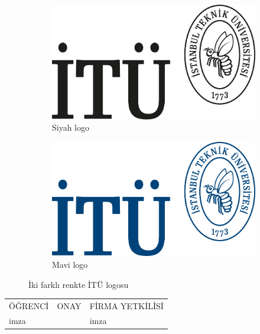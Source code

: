 \documentclass[12pt,a4paper]{report}
\begin{document}
\shorthandoff{=} %
\begin{figure}[h!]
  \centering
  \begin{subfigure}[b]{0.4\linewidth}
    \includegraphics[width=\linewidth]{black}
    \caption{Siyah logo}
  \end{subfigure}
  \begin{subfigure}[b]{0.4\linewidth}
    \includegraphics[width=\linewidth]{blue}
    \caption{Mavi logo}
  \end{subfigure}
  \caption{İki farklı renkte İTÜ logosu}
  \label{fig:coffee}
\end{figure}
\shorthandoff{=} %

\mbox{}
\vfill
\begin{center}
\begin{tabular}{|>{\centering}m{3.6cm}|>{\centering}m{7.4cm}|>{\centering}m{4cm}|}
ÖĞRENCİ&ONAY&FİRMA YETKİLİSİ
\tabularnewline
imza&&imza
\end{tabular}
\end{center}

\end{document}
